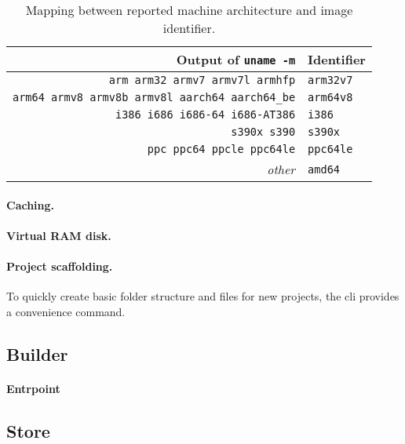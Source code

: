 \begin{table}[h]
  \setlength{\tabcolsep}{10pt}
  \centering
  \begin{tabular}{ r l }
    Output of \lstinline|uname -m| & Identifier \\
    \hline
    \lstinline|arm arm32 armv7 armv7l armhfp| & \lstinline|arm32v7| \\
    \lstinline|arm64 armv8 armv8b armv8l aarch64 aarch64_be| & \lstinline|arm64v8| \\
    \lstinline|i386 i686 i686-64 i686-AT386| & \lstinline|i386| \\
    \lstinline|s390x s390| & \lstinline|s390x| \\
    \lstinline|ppc ppc64 ppcle ppc64le| & \lstinline|ppc64le| \\
    \emph{other} & \lstinline|amd64| \\
  \end{tabular}
  \caption{Mapping between reported machine architecture and image identifier.}
\end{table}



\paragraph{Caching.}

\paragraph{Virtual RAM disk.}

\paragraph{Project scaffolding.} To quickly create basic folder structure and files for new projects, the \acrshort{cli} provides a convenience command.



\subsection{Builder}

\paragraph{Entrpoint}


\subsection{Store}
